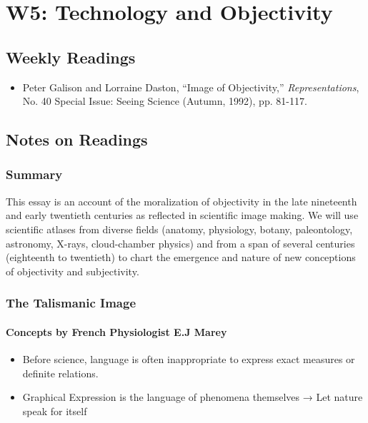 \documentclass[a4paper]{article}
\begin{document}
\newpage
\section{W5: Technology and Objectivity}
\subsection*{Weekly Readings}
\begin{itemize}
	\item Peter Galison and Lorraine Daston, ``Image of Objectivity,'' \textit{Representations}, No. 40
	Special Issue: Seeing Science (Autumn, 1992), pp. 81-117.
\end{itemize}

\subsection{Notes on Readings}
\subsubsection{Summary}
This essay is an account of the moralization of objectivity in the late nine­teenth and early twentieth centuries as reflected in scientific image making. We will use scientific atlases from diverse fields (anatomy, physiology, botany, paleontology, astronomy, X-rays, cloud-chamber physics) and from a span of several centuries (eighteenth to twentieth) to chart the emergence and nature of new conceptions of objectivity and subjectivity.

\subsubsection{The Talismanic Image}
\paragraph{Concepts by French Physiologist E.J Marey}
\begin{itemize}
	\item Before science, language is often inappropriate to express exact measures or definite relations.
	\item Graphical Expression is the language of phenomena themselves → Let nature speak for itself
\end{itemize}
\end{document}
